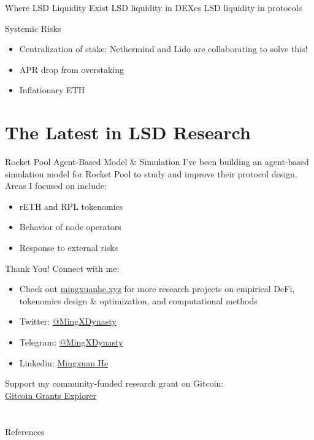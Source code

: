 \documentclass{beamer}
\begin{document}
\begin{frame}{Where LSD Liquidity Exist}
    LSD liquidity in DEXes
    LSD liquidity in protocols
\end{frame}

\begin{frame}{Systemic Risks}
    \begin{itemize}
        \item Centralization of stake: Nethermind and Lido are collaborating to solve this!
        \item APR drop from overstaking
        \item Inflationary ETH
    \end{itemize}
\end{frame}

\section[Research Insights]{The Latest in LSD Research}

\begin{frame}{Rocket Pool Agent-Based Model \& Simulation}
    I've been building an agent-based simulation model for Rocket Pool to study and improve their protocol design. Areas I focused on include:\\
    \begin{itemize}
        \item rETH and RPL tokenomics
        \item Behavior of node operators
        \item Response to external risks
    \end{itemize}
\end{frame}

\begin{frame}{Thank You!}
    Connect with me:\\ 
    \begin{itemize}
        \item Check out \href{https://www.mingxuanhe.xyz/}{mingxuanhe.xyz} for more research projects on empirical DeFi, tokenomics design \& optimization, and computational methods
        \item Twitter: \href{https://twitter.com/MingXDynasty}{@MingXDynasty}
        \item Telegram: \href{https://t.me/mingxdynasty}{@MingXDynasty}
        \item Linkedin: \href{https://www.linkedin.com/in/mingxuanhe/}{Mingxuan He}
    \end{itemize}

    \bigskip
    
    Support my community-funded research grant on Gitcoin: \\
    \href{https://explorer.gitcoin.co/\#/round/10/0xc5fdf5cff79e92fac1d6efa725c319248d279200/0xc5fdf5cff79e92fac1d6efa725c319248d279200-0}{\underline{Gitcoin Grants Explorer}}

\end{frame}

\section*{}

\begin{frame}[allowframebreaks]{References}
    \nocite{*}
    \printbibliography
\end{frame}
\end{document}
